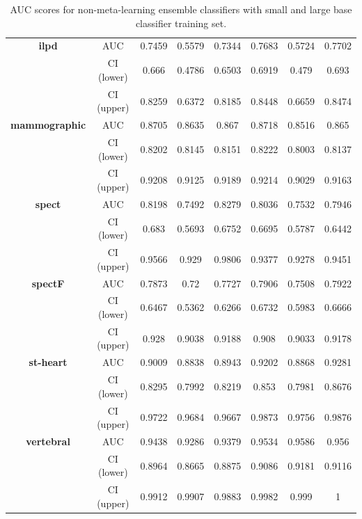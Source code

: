 \documentclass{document}
\begin{document}
\begin{table}[t]
\begin{tabular*}{16.5cm}{@{\extracolsep{\fill} } |c||c|c|c|c|c|c|c|}
    \textbf{ilpd} & AUC & 0.7459 & 0.5579 & 0.7344 & 0.7683 & 0.5724 & 0.7702\\
     & CI (lower) & 0.666 & 0.4786 & 0.6503 & 0.6919 & 0.479 & 0.693\\
     & CI (upper) & 0.8259 & 0.6372 & 0.8185 & 0.8448 & 0.6659 & 0.8474\\ \hline

    \textbf{mammographic} & AUC & 0.8705 & 0.8635 & 0.867 & 0.8718 & 0.8516 & 0.865\\
     & CI (lower) & 0.8202 & 0.8145 & 0.8151 & 0.8222 & 0.8003 & 0.8137\\
     & CI (upper) & 0.9208 & 0.9125 & 0.9189 & 0.9214 & 0.9029 & 0.9163\\ \hline

    \textbf{spect} & AUC & 0.8198 & 0.7492 & 0.8279 & 0.8036 & 0.7532 & 0.7946\\
     & CI (lower) & 0.683 & 0.5693 & 0.6752 & 0.6695 & 0.5787 & 0.6442\\
     & CI (upper) & 0.9566 & 0.929 & 0.9806 & 0.9377 & 0.9278 & 0.9451\\ \hline

    \textbf{spectF} & AUC & 0.7873 & 0.72 & 0.7727 & 0.7906 & 0.7508 & 0.7922\\
     & CI (lower) & 0.6467 & 0.5362 & 0.6266 & 0.6732 & 0.5983 & 0.6666\\
     & CI (upper) & 0.928 & 0.9038 & 0.9188 & 0.908 & 0.9033 & 0.9178\\ \hline

    \textbf{st-heart} & AUC & 0.9009 & 0.8838 & 0.8943 & 0.9202 & 0.8868 & 0.9281\\
     & CI (lower) & 0.8295 & 0.7992 & 0.8219 & 0.853 & 0.7981 & 0.8676\\
     & CI (upper) & 0.9722 & 0.9684 & 0.9667 & 0.9873 & 0.9756 & 0.9876\\ \hline

    \textbf{vertebral} & AUC & 0.9438 & 0.9286 & 0.9379 & 0.9534 & 0.9586 & 0.956\\
     & CI (lower) & 0.8964 & 0.8665 & 0.8875 & 0.9086 & 0.9181 & 0.9116\\
     & CI (upper) & 0.9912 & 0.9907 & 0.9883 & 0.9982 & 0.999 & 1\\ \hline
\end{tabular*}
\caption{AUC scores for non-meta-learning ensemble classifiers with small and large base classifier training set.}
\label{fig:06}
\end{table}
\end{document}
